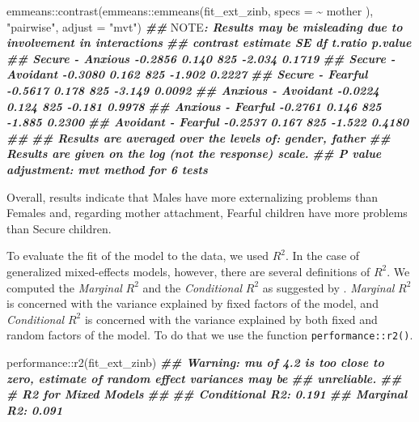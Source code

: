 \documentclass[
]{book}
\newenvironment{Shaded}{\begin{snugshade}}{\end{snugshade}}
\newcommand{\AlertTok}[1]{\textcolor[rgb]{0.94,0.16,0.16}{#1}}
\newcommand{\AttributeTok}[1]{\textcolor[rgb]{0.77,0.63,0.00}{#1}}
\newcommand{\DocumentationTok}[1]{\textcolor[rgb]{0.56,0.35,0.01}{\textbf{\textit{#1}}}}
\newcommand{\FunctionTok}[1]{\textcolor[rgb]{0.00,0.00,0.00}{#1}}
\newcommand{\NormalTok}[1]{#1}
\newcommand{\SpecialCharTok}[1]{\textcolor[rgb]{0.00,0.00,0.00}{#1}}
\newcommand{\StringTok}[1]{\textcolor[rgb]{0.31,0.60,0.02}{#1}}
\begin{document}
\begin{Shaded}
\begin{Highlighting}[]
\NormalTok{emmeans}\SpecialCharTok{::}\FunctionTok{contrast}\NormalTok{(emmeans}\SpecialCharTok{::}\FunctionTok{emmeans}\NormalTok{(fit\_ext\_zinb, }\AttributeTok{specs =} \SpecialCharTok{\textasciitilde{}}\NormalTok{ mother ),}
                  \StringTok{"pairwise"}\NormalTok{, }\AttributeTok{adjust =} \StringTok{"mvt"}\NormalTok{)}
\DocumentationTok{\#\# }\AlertTok{NOTE}\DocumentationTok{: Results may be misleading due to involvement in interactions}
\DocumentationTok{\#\#  contrast           estimate    SE  df t.ratio p.value}
\DocumentationTok{\#\#  Secure {-} Anxious    {-}0.2856 0.140 825  {-}2.034  0.1719}
\DocumentationTok{\#\#  Secure {-} Avoidant   {-}0.3080 0.162 825  {-}1.902  0.2227}
\DocumentationTok{\#\#  Secure {-} Fearful    {-}0.5617 0.178 825  {-}3.149  0.0092}
\DocumentationTok{\#\#  Anxious {-} Avoidant  {-}0.0224 0.124 825  {-}0.181  0.9978}
\DocumentationTok{\#\#  Anxious {-} Fearful   {-}0.2761 0.146 825  {-}1.885  0.2300}
\DocumentationTok{\#\#  Avoidant {-} Fearful  {-}0.2537 0.167 825  {-}1.522  0.4180}
\DocumentationTok{\#\# }
\DocumentationTok{\#\# Results are averaged over the levels of: gender, father }
\DocumentationTok{\#\# Results are given on the log (not the response) scale. }
\DocumentationTok{\#\# P value adjustment: mvt method for 6 tests}
\end{Highlighting}
\end{Shaded}

Overall, results indicate that Males have more externalizing problems than Females and, regarding mother attachment, Fearful children have more problems than Secure children.

To evaluate the fit of the model to the data, we used \(R^2\). In the case of generalized mixed-effects models, however, there are several definitions of \(R^2\). We computed the \emph{Marginal} \(R^2\) and the \emph{Conditional} \(R^2\) as suggested by \citet{nakagawaCoefficientDeterminationR22017}. \emph{Marginal} \(R^2\) is concerned with the variance explained by fixed factors of the model, and \emph{Conditional} \(R^2\) is concerned with the variance explained by both fixed and random factors of the model. To do that we use the function \texttt{performance::r2()}.

\begin{Shaded}
\begin{Highlighting}[]
\NormalTok{performance}\SpecialCharTok{::}\FunctionTok{r2}\NormalTok{(fit\_ext\_zinb)}
\DocumentationTok{\#\# Warning: mu of 4.2 is too close to zero, estimate of random effect variances may be}
\DocumentationTok{\#\#   unreliable.}
\DocumentationTok{\#\# \# R2 for Mixed Models}
\DocumentationTok{\#\# }
\DocumentationTok{\#\#   Conditional R2: 0.191}
\DocumentationTok{\#\#      Marginal R2: 0.091}
\end{Highlighting}
\end{Shaded}
\end{document}
